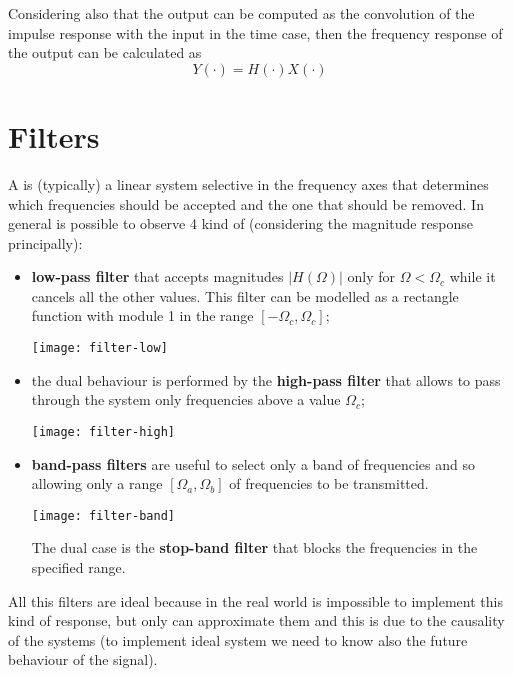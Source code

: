 	Considering also that the output can be computed as the convolution of the impulse response with the input in the time case, then the frequency response of the output can be calculated as
	\begin{equation}
		Y(\cdot) = H(\cdot) X(\cdot)
	\end{equation}
	
\section{Filters}
	A  is (typically) a linear system selective in the frequency axes that determines which frequencies should be accepted and the one that should be removed. In general is possible to observe 4 kind of  (considering the magnitude response principally):
	\begin{itemize}
		\item \textbf{low-pass filter} that accepts magnitudes $|H(\Omega)|$ only for $\Omega < \Omega_c$ while it cancels all the other values. This filter can be modelled as a rectangle function with module 1 in the range $[-\Omega_c,\Omega_c]$;
		\begin{center}
			\texttt{[image: filter-low]}
		\end{center}
		
		\item the dual behaviour is performed by the \textbf{high-pass filter} that allows to pass through the system only frequencies above a value $\Omega_c$;
		\begin{center}
			\texttt{[image: filter-high]}
		\end{center}
		
		\item \textbf{band-pass filters} are useful to select only a band of frequencies and so allowing only a range $[\Omega_a,\Omega_b]$ of frequencies to be transmitted.
		\begin{center}
			\texttt{[image: filter-band]}
		\end{center}
		
		The dual case is the \textbf{stop-band filter} that blocks the frequencies in the specified range.
	\end{itemize}
	All this filters are ideal because in  the real world is impossible to implement this kind of response, but only can approximate them and this is due to the causality of the systems (to implement ideal system we need to know also the future behaviour of the signal).
	

